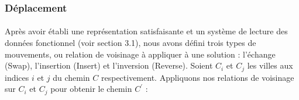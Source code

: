 \documentclass[a4paper,10pt]{report}
\begin{document}
\subsubsection{Déplacement}
\paragraph{}
  Après avoir établi une représentation satisfaisante et un système de lecture
des données fonctionnel (voir section 3.1), nous avons défini trois types de
mouvements, ou relation de voisinage à appliquer à une solution : l'échange
(Swap), l'insertion (Insert) et l'inversion (Reverse). Soient $C_i$ et $C_j$ les
villes aux indices $i$ et $j$ du chemin $C$ respectivement. Appliquons nos
relations de voisinage sur $C_i$ et $C_j$ pour obtenir le chemin $C^{'}$ :

\paragraph{}
\end{document}

